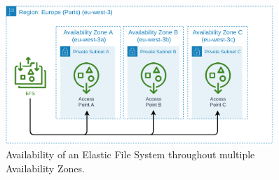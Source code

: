 \begin{figure}[!htbp]
    \centering
    \includegraphics[width=0.90\textwidth]{img/diagrams/pdf/final-arch-efs.drawio.pdf}
    \caption[Elastic File System]{Availability of an Elastic File System throughout multiple Availability Zones.}
    \label{fig:final-arch-efs}
\end{figure}
